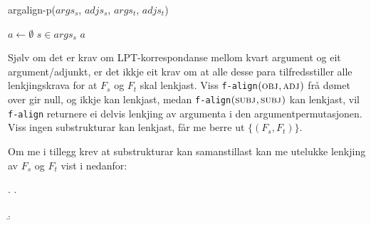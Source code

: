 \documentclass[11pt,a4paper,oneside,draft]{book}
\newcommand{\F}[2]{\textsc{#1}\ensuremath{_{#2}}}
\newcommand{\OBJ}{\F{obj}{}}
\newcommand{\ADJ}{\F{adj}{}}
\newcommand{\SUBJ}{\F{subj}{}}
\begin{document}
    
      \begin{algorithm}[]
      \caption{argalign-p($args_s$, $adjs_s$, $args_t$, $adjs_t$)}
      \label{algo:argalign-p}
    
      \BlankLine
      
     $a \gets \emptyset$\;
      {
           $s \in args_s$\;
            {
            }
            {
           }
             \Return $a$\;
         }
           {
          }
      \end{algorithm}

Sjølv om det er krav om LPT-korrespondanse mellom kvart argument og
eit argument/adjunkt, er det ikkje eit krav om at alle desse para
tilfredsstiller alle lenkjingskrava for at $F_s$ og $F_t$ skal
lenkjast. Viss \texttt{f-align}$(\OBJ,\ADJ)$ frå dømet over gir null,
og ikkje kan lenkjast, medan \texttt{f-align}$(\SUBJ,\SUBJ)$ kan
lenkjast, vil \texttt{f-align} returnere ei delvis lenkjing av argumenta i
den argumentpermutasjonen. Viss ingen substrukturar kan lenkjast, får
me berre ut $\{(F_s,F_t)\}$.


Om me i tillegg krev at substrukturar kan samanstillast kan me
utelukke lenkjing av $F_s$ og $F_t$ vist i \Next nedanfor:

{\avmoptions{}

\ex. \a.  \begin{avm}    \end{avm}
  \b.\begin{avm}  \end{avm}

}
\end{document}
